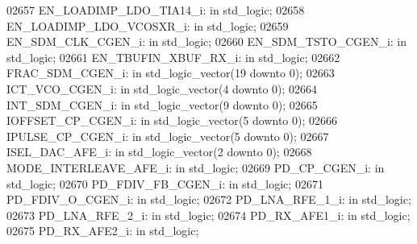 \begin{DoxyCode}
02657     EN\_LOADIMP\_LDO\_TIA14\_i: \textcolor{keywordflow}{in} \textcolor{comment}{std\_logic};
02658     EN\_LOADIMP\_LDO\_VCOSXR\_i:    \textcolor{keywordflow}{in} \textcolor{comment}{std\_logic};
02659     EN\_SDM\_CLK\_CGEN\_i:  \textcolor{keywordflow}{in} \textcolor{comment}{std\_logic};
02660     EN\_SDM\_TSTO\_CGEN\_i: \textcolor{keywordflow}{in} \textcolor{comment}{std\_logic};
02661     EN\_TBUFIN\_XBUF\_RX\_i:    \textcolor{keywordflow}{in} \textcolor{comment}{std\_logic};
02662     FRAC\_SDM\_CGEN\_i:    \textcolor{keywordflow}{in} \textcolor{comment}{std\_logic\_vector}(\textcolor{vhdllogic}{}\textcolor{vhdllogic}{19} \textcolor{keywordflow}{downto} \textcolor{vhdllogic}{}\textcolor{vhdllogic}{0});
02663     ICT\_VCO\_CGEN\_i: \textcolor{keywordflow}{in} \textcolor{comment}{std\_logic\_vector}(\textcolor{vhdllogic}{}\textcolor{vhdllogic}{4} \textcolor{keywordflow}{downto} \textcolor{vhdllogic}{}\textcolor{vhdllogic}{0});
02664     INT\_SDM\_CGEN\_i: \textcolor{keywordflow}{in} \textcolor{comment}{std\_logic\_vector}(\textcolor{vhdllogic}{}\textcolor{vhdllogic}{9} \textcolor{keywordflow}{downto} \textcolor{vhdllogic}{}\textcolor{vhdllogic}{0});
02665     IOFFSET\_CP\_CGEN\_i:  \textcolor{keywordflow}{in} \textcolor{comment}{std\_logic\_vector}(\textcolor{vhdllogic}{}\textcolor{vhdllogic}{5} \textcolor{keywordflow}{downto} \textcolor{vhdllogic}{}\textcolor{vhdllogic}{0});
02666     IPULSE\_CP\_CGEN\_i:   \textcolor{keywordflow}{in} \textcolor{comment}{std\_logic\_vector}(\textcolor{vhdllogic}{}\textcolor{vhdllogic}{5} \textcolor{keywordflow}{downto} \textcolor{vhdllogic}{}\textcolor{vhdllogic}{0});
02667     ISEL\_DAC\_AFE\_i: \textcolor{keywordflow}{in} \textcolor{comment}{std\_logic\_vector}(\textcolor{vhdllogic}{}\textcolor{vhdllogic}{2} \textcolor{keywordflow}{downto} \textcolor{vhdllogic}{}\textcolor{vhdllogic}{0});
02668     MODE\_INTERLEAVE\_AFE\_i:  \textcolor{keywordflow}{in} \textcolor{comment}{std\_logic};
02669     PD\_CP\_CGEN\_i:   \textcolor{keywordflow}{in} \textcolor{comment}{std\_logic};
02670     PD\_FDIV\_FB\_CGEN\_i:  \textcolor{keywordflow}{in} \textcolor{comment}{std\_logic};
02671     PD\_FDIV\_O\_CGEN\_i:   \textcolor{keywordflow}{in} \textcolor{comment}{std\_logic};
02672     PD\_LNA\_RFE\_1\_i: \textcolor{keywordflow}{in} \textcolor{comment}{std\_logic};
02673     PD\_LNA\_RFE\_2\_i: \textcolor{keywordflow}{in} \textcolor{comment}{std\_logic};
02674     PD\_RX\_AFE1\_i:   \textcolor{keywordflow}{in} \textcolor{comment}{std\_logic};
02675     PD\_RX\_AFE2\_i:   \textcolor{keywordflow}{in} \textcolor{comment}{std\_logic};

\end{DoxyCode}
